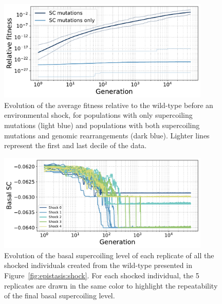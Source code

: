 \begin{figure}
\centering
\includegraphics[width=0.9\textwidth]{epistasis/img/sc-only/relative_fitness_grouped.pdf}
\caption[Average relative fitness during evolution after an environmental shock, with only supercoiling mutations]{Evolution of the average fitness relative to the wild-type before an environmental shock, for populations with only supercoiling mutations (light blue) and populations with both supercoiling mutations and genomic rearrangements (dark blue).
Lighter lines represent the first and last decile of the data.}
\label{fig:epistasis:sc-only-fitness}
\end{figure}

\begin{figure}
\centering
\includegraphics[width=0.9\textwidth]{epistasis/img/sc-only/sc_wt_01_all_shuffles.pdf}
\caption[Evolution of the basal supercoiling level in shocked individuals with supercoiling mutations only]{Evolution of the basal supercoiling level of each replicate of all the shocked individuals created from the wild-type presented in Figure~\ref{fig:epistasis:shock}.
For each shocked individual, the 5 replicates are drawn in the same color to highlight the repeatability of the final basal supercoiling level.}
\label{fig:epistasis:sc-only-basal-sc}
\end{figure}

